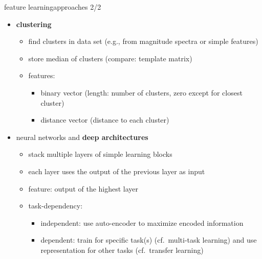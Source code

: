         \begin{frame}{feature learning}{approaches 2/2}
            \begin{itemize}
                \item   \textbf{clustering} 
                    \begin{itemize}
                        \item   find clusters in data set (e.g., from magnitude spectra or simple features)
                        \item   store median of clusters (compare: template matrix)
                        \smallskip
                        \item<2->[$\rightarrow$]   features:
                            \begin{itemize}
                                \item   binary vector (length: number of clusters, zero except for closest cluster)
                                \item   distance vector (distance to each cluster)
                            \end{itemize}
                    \end{itemize}
                \bigskip
                \item<3->   neural networks and \textbf{deep architectures} 
                    \begin{itemize}
                        \item   stack multiple layers of simple learning blocks
                        \item   each layer uses the output of the previous layer as input
                        \smallskip
                        \item<4->[$\rightarrow$]   feature: output of the highest layer
                        \item<5->   task-dependency:
                            \begin{itemize}
                                \item   independent: use auto-encoder to maximize encoded information
                                \item   dependent: train for specific task(s) (cf.\ multi-task learning) and use representation for other tasks (cf.\ transfer learning)
                            \end{itemize}
                    \end{itemize}
            \end{itemize}
		\end{frame}
                
